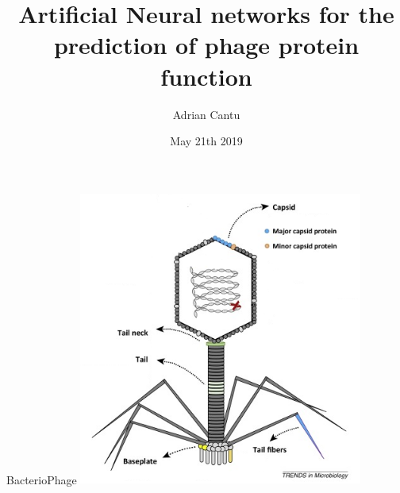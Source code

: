 \documentclass{beamer}
\title[State of the lab - 2019]{Artificial Neural networks for the prediction of phage protein function }
\author[A. Cantu]{Adrian Cantu}
\institute[]{
  San Diego State University \\
  Computational Science Research Center}
\date[05/21/2019]{
  May 21th 2019}
\begin{document}
\begin{frame}
  \titlepage
  \centering
\end{frame}


\begin{frame}{BacterioPhage}
\includegraphics[width=0.70\textwidth]{img01}
\end{frame}
\end{document}
